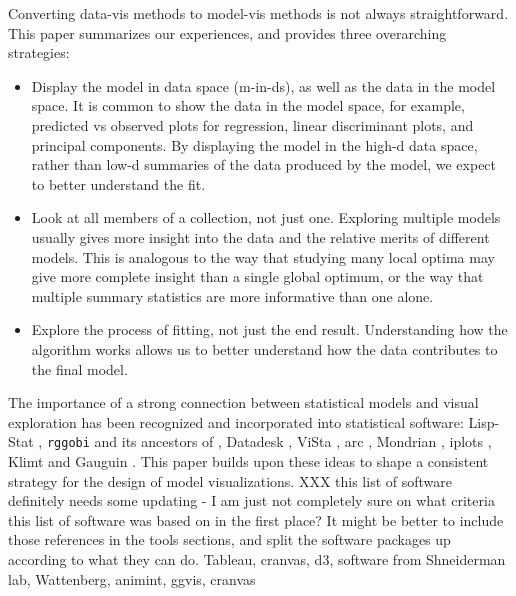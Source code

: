 \documentclass[preprint]{imsart}
\newcommand{\hh}[1]{{\color{ForestGreen} #1}}
\begin{document}
Converting data-vis methods to model-vis methods is not always straightforward. This paper summarizes our experiences, and provides three overarching strategies:

\begin{itemize}
\item Display the model in data space (m-in-ds), as well as the
  data in the model space. It is common to show the data in the model
  space, for example, predicted vs observed plots for regression,
  linear discriminant plots, and principal components.  By displaying
  the model in the high-d data space, rather than low-d summaries of the
  data produced by the model, we expect to better understand the fit.

\item Look at all members of a collection, not just
  one.  Exploring multiple models  usually gives more insight into
  the data and the relative merits of different models. This is
  analogous to the way that studying many local optima may give more
  complete insight than a single global optimum, or the way that
  multiple summary statistics are more informative than one alone.

\item Explore the process of fitting, not just the
  end result.  Understanding how the algorithm works allows us to
  better understand how the data contributes to the final model.

\end{itemize}

The importance of a strong connection between statistical models and visual exploration has been recognized and incorporated into statistical software: Lisp-Stat \citep{tierney:1990}, {\tt rggobi} and its ancestors of \citep{swayne:1991}, Datadesk \citep{velleman:1992}, ViSta \citep{young:1993}, {\sc arc} \citep{cook:1998}, Mondrian \citep{theus:2003}, iplots \citep{iplots}, Klimt \citep{urbanek:2002a} and Gauguin \citep{gribov:2007}. This paper builds upon these ideas to shape a consistent strategy for the design of model visualizations.
\hh{XXX this list of software definitely needs some updating - I am just not completely sure on what criteria this list of software was based on in the first place? It might be better to include those references in the tools sections, and split the software packages up according to what they can do.  Tableau, cranvas, d3, software from Shneiderman lab, Wattenberg,  animint, ggvis, cranvas}
\end{document}
